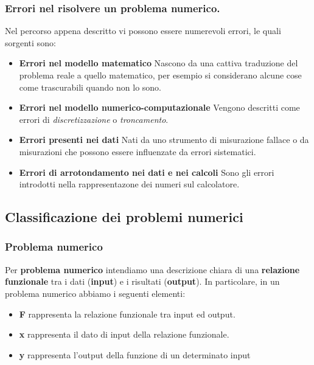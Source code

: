 \subsubsection{Errori nel risolvere un problema numerico.}
Nel percorso appena descritto vi possono essere numerevoli errori, 
%
le quali sorgenti sono:
\begin{itemize}
    \item \textbf{Errori nel modello matematico} Nascono da una cattiva 
%
    traduzione del problema reale a quello matematico, per esempio si 
%
    considerano alcune cose come trascurabili quando non lo sono.
    \item \textbf{Errori nel modello numerico-computazionale} Vengono 
%
    descritti come errori di \textit{discretizzazione} o \textit{troncamento}.
    \item \textbf{Errori presenti nei dati} Nati da uno strumento di
%
    misurazione fallace o da misurazioni che possono essere influenzate
%
    da errori sistematici.
    \item \textbf{Errori di arrotondamento nei dati e nei calcoli} Sono 
%
    gli errori introdotti nella rappresentazone dei numeri sul calcolatore.
\end{itemize}
\newpage
\subsection{Classificazione dei problemi numerici}
\subsubsection{Problema numerico}
{
    Per \textbf{problema numerico}
        intendiamo una descrizione chiara di una \textbf{relazione funzionale}  
        tra i dati (\textbf{input}) e i risultati (\textbf{output}).   
}
In particolare, in un problema numerico abbiamo i seguenti elementi:
\begin{itemize}
    \item \textbf{F} rappresenta la relazione funzionale tra input ed output.
    \item \textbf{x} rappresenta il dato di input della relazione funzionale.
    \item \textbf{y} rappresenta l’output della funzione di un determinato input
\end{itemize}
